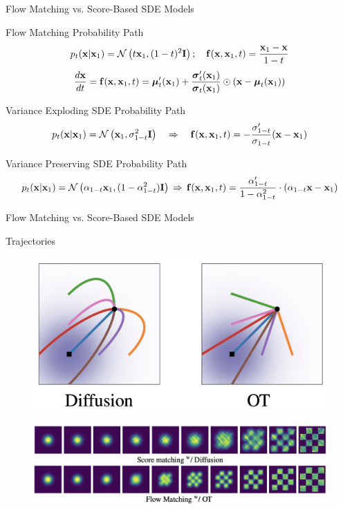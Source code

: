 \documentclass{beamer}
\begin{document}
\begin{frame}{Flow Matching vs. Score-Based SDE Models}
	\begin{block}{Flow Matching Probability Path}
		\vspace{-0.3cm}
		\[
			p_t(\mathbf{x} | \mathbf{x}_1) = \mathcal{N}\left(t \mathbf{x}_1, (1-t)^2 \mathbf{I}\right); \quad \mathbf{f}(\mathbf{x}, \mathbf{x}_1, t) = \frac{\mathbf{x}_1  - \mathbf{x}}{1-t}
		\]
		\vspace{-0.3cm}
		\[
	 		\frac{d\mathbf{x}}{dt} = \mathbf{f}(\mathbf{x}, \mathbf{x}_1, t) =  \boldsymbol{\mu}_t'(\mathbf{x}_1) + \frac{\boldsymbol{\sigma}_t'(\mathbf{x}_1)}{\boldsymbol{\sigma}_t(\mathbf{x}_1)} \odot (\mathbf{x} - \boldsymbol{\mu}_t(\mathbf{x}_1))
		\]
	\end{block}
	\begin{block}{Variance Exploding SDE Probability Path}
		\vspace{-0.3cm}
		\[
				p_t(\mathbf{x} | \mathbf{x}_1) = \mathcal{N}\left(\mathbf{x}_1, \sigma^2_{1-t}  \mathbf{I}\right) \quad \Rightarrow \quad 
				\mathbf{f}(\mathbf{x}, \mathbf{x}_1, t) = - \frac{\sigma'_{1-t}}{\sigma_{1-t}} (\mathbf{x} - \mathbf{x}_1)
		\]
		\vspace{-0.3cm}
	\end{block}
	\begin{block}{Variance Preserving SDE Probability Path}
		\vspace{-0.3cm}
		{\small
		\[
			p_t(\mathbf{x} | \mathbf{x}_1) = \mathcal{N}\left(\alpha_{1-t}  \mathbf{x}_1, (1 - \alpha^2_{1-t})  \mathbf{I} \right)  \, \Rightarrow \, 
		\mathbf{f}(\mathbf{x}, \mathbf{x}_1, t) = \frac{\alpha'_{1-t}}{1 - \alpha^2_{1-t}}\cdot \left(\alpha_{1-t}  \mathbf{x} - \mathbf{x}_1\right)
		\]
		}
	\end{block}
\end{frame}
\begin{frame}{Flow Matching vs. Score-Based SDE Models}
	\begin{block}{Trajectories}
		\vspace{-0.3cm}
		\begin{figure}
			\centering
			\includegraphics[width=0.6\linewidth]{figs/trajectories}
		\end{figure}
		\vspace{-0.3cm}
	\end{block}
	\begin{figure}
		\centering
		\includegraphics[width=\linewidth]{figs/2d-generation}
	\end{figure}
\end{frame}
\end{document}
